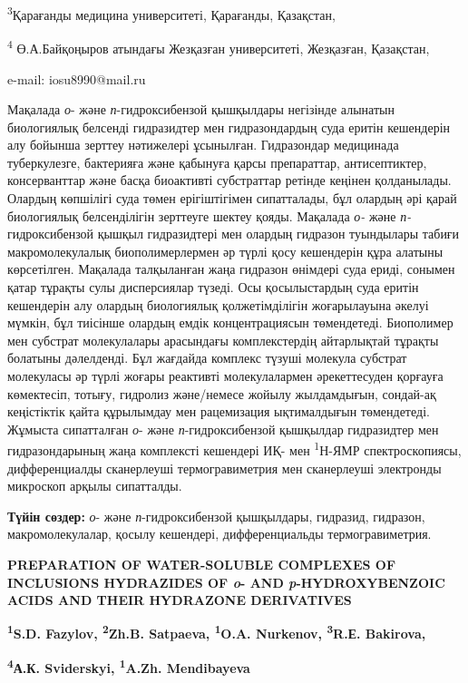 \textsuperscript{3}Қарағанды медицина университеті, Қарағанды,
Қазақстан,

\textsuperscript{4} Ө.А.Байқоңыров атындағы Жезқазған университеті,
Жезқазған, Қазақстан,

e-mail: iosu8990@mail.ru

Мақалада \emph{о}- және \emph{п}-гидроксибензой қышқылдары негізінде
алынатын биологиялық белсенді гидразидтер мен гидразондардың суда еритін
кешендерін алу бойынша зерттеу нәтижелері ұсынылған. Гидразондар
медицинада туберкулезге, бактерияға және қабынуға қарсы препараттар,
антисептиктер, консерванттар және басқа биоактивті субстраттар ретінде
кеңінен қолданылады. Олардың көпшілігі суда төмен ерігіштігімен
сипатталады, бұл олардың әрі қарай биологиялық белсенділігін зерттеуге
шектеу қояды. Мақалада \emph{о-} және \emph{п-}гидроксибензой қышқыл
гидразидтері мен олардың гидразон туындылары табиғи макромолекулалық
биополимерлермен әр түрлі қосу кешендерін құра алатыны көрсетілген.
Мақалада талқыланған жаңа гидразон өнімдері суда ериді, сонымен қатар
тұрақты сулы дисперсиялар түзеді. Осы қосылыстардың суда еритін
кешендерін алу олардың биологиялық қолжетімділігін жоғарылауына әкелуі
мүмкін, бұл тиісінше олардың емдік концентрациясын төмендетеді.
Биополимер мен субстрат молекулалары арасындағы комплекстердің
айтарлықтай тұрақты болатыны дәлелденді. Бұл жағдайда комплекс түзуші
молекула субстрат молекуласы әр түрлі жоғары реактивті молекулалармен
әрекеттесуден қорғауға көмектесіп, тотығу, гидролиз және/немесе жойылу
жылдамдығын, сондай-ақ кеңістіктік қайта құрылымдау мен рацемизация
ықтималдығын төмендетеді. Жұмыста сипатталған \emph{о}- және
\emph{п}-гидроксибензой қышқылдар гидразидтер мен гидразондарының жаңа
комплексті кешендері ИҚ- мен \textsuperscript{1}Н-ЯМР спектроскопиясы,
дифференциалды сканерлеуші термогравиметрия мен сканерлеуші электронды
микроскоп арқылы сипатталды.

{\bfseries Түйін сөздер:} \emph{о}- және \emph{п}-гидроксибензой
қышқылдары, гидразид, гидразон, макромолекулалар, қосылу кешендері,
дифференциальды термогравиметрия.

{\bfseries PREPARATION OF WATER-SOLUBLE COMPLEXES OF INCLUSIONS HYDRAZIDES
OF \emph{o}- AND \emph{p}-HYDROXYBENZOIC ACIDS AND THEIR HYDRAZONE
DERIVATIVES}

{\bfseries \textsuperscript{1}S.D. Fazylov, \textsuperscript{2}Zh.B.
Satpaeva, \textsuperscript{1}O.A. Nurkenov, \textsuperscript{3}R.Е.
Bakirova,}

{\bfseries \textsuperscript{4}А.К. Sviderskyi, \textsuperscript{1}A.Zh.
Mendibayeva}

